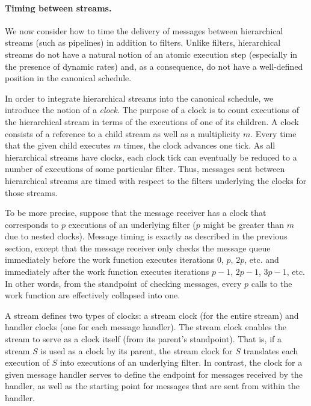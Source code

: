 \paragraph{Timing between streams.}

We now consider how to time the delivery of messages between
hierarchical streams (such as pipelines) in addition to filters.
Unlike filters, hierarchical streams do not have a natural notion of
an atomic execution step (especially in the presence of dynamic rates)
and, as a consequence, do not have a well-defined position in the
canonical schedule.

In order to integrate hierarchical streams into the canonical
schedule, we introduce the notion of a {\it clock}.  The purpose of a
clock is to count executions of the hierarchical stream in terms of
the executions of one of its children.  A clock consists of a
reference to a child stream as well as a multiplicity $m$.  Every time
that the given child executes $m$ times, the clock advances one tick.
As all hierarchical streams have clocks, each clock tick can
eventually be reduced to a number of executions of some particular
filter.  Thus, messages sent between hierarchical streams are timed
with respect to the filters underlying the clocks for those streams.

To be more precise, suppose that the message receiver has a clock that
corresponds to $p$ executions of an underlying filter ($p$ might be
greater than $m$ due to nested clocks).  Message timing is exactly as
described in the previous section, except that the message receiver
only checks the message queue immediately before the work function
executes iterations $0$, $p$, $2p$, etc. and immediately after the
work function executes iterations $p-1$, $2p-1$, $3p-1$, etc.  In
other words, from the standpoint of checking messages, every $p$ calls
to the work function are effectively collapsed into one.

A stream defines two types of clocks: a stream clock (for the entire
stream) and handler clocks (one for each message handler).  The stream
clock enables the stream to serve as a clock itself (from its parent's
standpoint).  That is, if a stream $S$ is used as a clock by its
parent, the stream clock for $S$ translates each execution of $S$ into
executions of an underlying filter.  In contrast, the clock for a
given message handler serves to define the endpoint for messages
received by the handler, as well as the starting point for messages
that are sent from within the handler.

